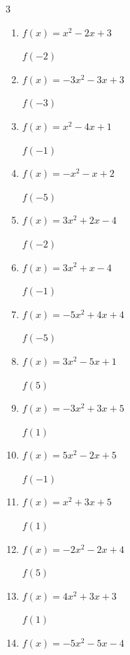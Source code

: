 \begin{multicols}{3}
\begin{enumerate}
$f(-2)$
        \phantom{$= -25$}

  \item $f(x)=x^{2}-2x+3$

$f(-2)$
        \phantom{$= 11$}

  \item $f(x)=-3x^{2}-3x+3$

$f(-3)$
        \phantom{$= -15$}

  \item $f(x)=x^{2}-4x+1$

$f(-1)$
        \phantom{$= 6$}

  \item $f(x)=-x^{2}-x+2$

$f(-5)$
        \phantom{$= -18$}

  \item $f(x)=3x^{2}+2x-4$

$f(-2)$
        \phantom{$= 4$}

\columnbreak %

  \item $f(x)=3x^{2}+x-4$

$f(-1)$
        \phantom{$= -2$}

  \item $f(x)=-5x^{2}+4x+4$

$f(-5)$
        \phantom{$= -141$}

  \item $f(x)=3x^{2}-5x+1$

$f(5)$
        \phantom{$= 51$}

  \item $f(x)=-3x^{2}+3x+5$

$f(1)$
        \phantom{$= 5$}

  \item $f(x)=5x^{2}-2x+5$

$f(-1)$
        \phantom{$= 12$}

  \item $f(x)=x^{2}+3x+5$

$f(1)$
        \phantom{$= 9$}

  \item $f(x)=-2x^{2}-2x+4$

$f(5)$
        \phantom{$= -56$}

  \item $f(x)=4x^{2}+3x+3$

$f(1)$
        \phantom{$= 10$}

  \item $f(x)=-5x^{2}-5x-4$


\end{enumerate}
\end{multicols}

